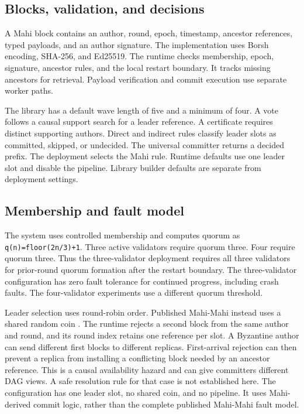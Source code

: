 \documentclass[11pt]{article}
\begin{document}
\subsection{Blocks, validation, and decisions}
A Mahi block contains an author, round, epoch, timestamp, ancestor references, typed payloads, and an author signature. The implementation uses Borsh encoding, SHA-256, and Ed25519. The runtime checks membership, epoch, signature, ancestor rules, and the local restart boundary. It tracks missing ancestors for retrieval. Payload verification and commit execution use separate worker paths. \cite{R12}

The library has a default wave length of five and a minimum of four. A vote follows a causal support search for a leader reference. A certificate requires distinct supporting authors. Direct and indirect rules classify leader slots as committed, skipped, or undecided. The universal committer returns a decided prefix. The deployment selects the Mahi rule. Runtime defaults use one leader slot and disable the pipeline. Library builder defaults are separate from deployment settings. \cite{R12}

\subsection{Membership and fault model}
The system uses controlled membership and computes quorum as \texttt{q(n)=floor(2n/3)+1}. Three active validators require quorum three. Four require quorum three. Thus the three-validator deployment requires all three validators for prior-round quorum formation after the restart boundary. The three-validator configuration has zero fault tolerance for continued progress, including crash faults. The four-validator experiments use a different quorum threshold. \cite{R12}

Leader selection uses round-robin order. Published Mahi-Mahi instead uses a shared random coin \cite{R01}. The runtime rejects a second block from the same author and round, and its round index retains one reference per slot. A Byzantine author can send different first blocks to different replicas. First-arrival rejection can then prevent a replica from installing a conflicting block needed by an ancestor reference. This is a causal availability hazard and can give committers different DAG views. A safe resolution rule for that case is not established here. The configuration has one leader slot, no shared coin, and no pipeline. It uses Mahi-derived commit logic, rather than the complete published Mahi-Mahi fault model. \cite{R12}
\end{document}
